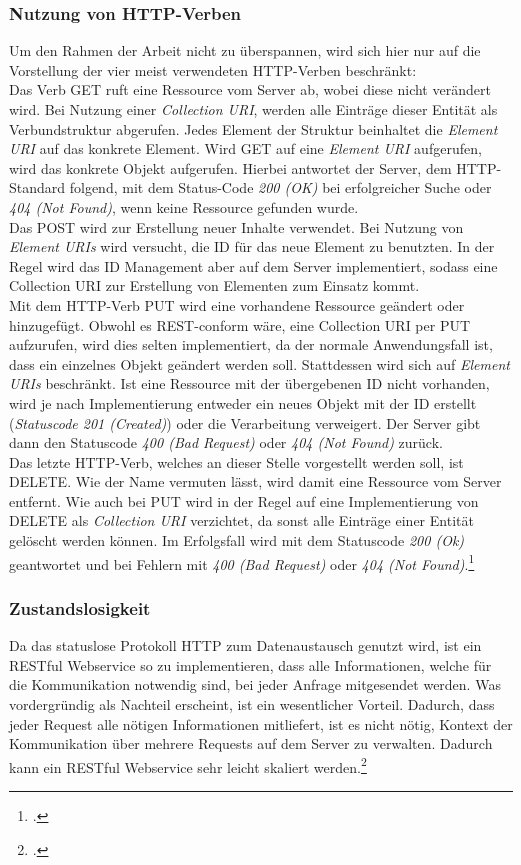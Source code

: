 \subsubsection*{Nutzung von HTTP-Verben}
Um den Rahmen der Arbeit nicht zu überspannen, wird sich hier nur auf die Vorstellung der vier meist verwendeten \ac{HTTP}-Verben beschränkt:\\
Das Verb GET ruft eine Ressource vom Server ab, wobei diese nicht verändert wird. Bei Nutzung einer \textit{Collection \ac{URI}}, werden alle Einträge dieser Entität als Verbundstruktur abgerufen. Jedes Element der Struktur beinhaltet die \textit{Element URI} auf das konkrete Element. Wird GET auf eine \textit{Element URI} aufgerufen, wird das konkrete Objekt aufgerufen. Hierbei antwortet der Server, dem \ac{HTTP}-Standard folgend, mit dem Status-Code \textit{200 (OK)} bei erfolgreicher Suche oder \textit{404 (Not Found)}, wenn keine Ressource gefunden wurde.\\
Das POST wird zur Erstellung neuer Inhalte verwendet. Bei Nutzung von \textit{Element \ac{URI}s} wird versucht, die ID für das neue Element zu benutzten. In der Regel wird das ID Management aber auf dem Server implementiert, sodass eine Collection \ac{URI} zur Erstellung von Elementen zum Einsatz kommt.\\
Mit dem HTTP-Verb PUT wird eine vorhandene Ressource geändert oder hinzugefügt. Obwohl es \ac{REST}-conform wäre, eine Collection \ac{URI} per PUT aufzurufen, wird dies selten implementiert, da der normale Anwendungsfall ist, dass ein einzelnes Objekt geändert werden soll. Stattdessen wird sich auf \textit{Element \ac{URI}s} beschränkt. Ist eine Ressource mit der übergebenen ID nicht vorhanden, wird je nach Implementierung entweder ein neues Objekt mit der ID erstellt (\textit{Statuscode 201 (Created)}) oder die Verarbeitung verweigert. Der Server gibt dann den Statuscode \textit{400 (Bad Request)} oder \textit{404 (Not Found)}  zurück. \\
Das letzte HTTP-Verb, welches an dieser Stelle vorgestellt werden soll, ist DELETE. Wie der Name vermuten lässt, wird damit eine Ressource vom Server entfernt. Wie auch bei PUT wird in der Regel auf eine Implementierung von DELETE als \textit{Collection \ac{URI}} verzichtet, da sonst alle Einträge einer Entität gelöscht werden können. Im Erfolgsfall wird mit dem Statuscode \textit{200 (Ok)} geantwortet und bei Fehlern mit \textit{400 (Bad Request)} oder \textit{404 (Not Found)}.\footcite[S. 26ff.]{REST-und-HTTP}
\subsubsection*{Zustandslosigkeit}
Da das statuslose Protokoll \ac{HTTP} zum Datenaustausch genutzt wird, ist ein \ac{REST}ful Webservice so zu implementieren, dass alle Informationen, welche für die Kommunikation notwendig sind, bei jeder Anfrage mitgesendet werden. Was vordergründig als Nachteil erscheint, ist ein wesentlicher Vorteil. Dadurch, dass jeder Request alle nötigen Informationen mitliefert, ist es nicht nötig, Kontext der Kommunikation über mehrere Requests auf dem Server zu verwalten. Dadurch kann ein \ac{REST}ful Webservice sehr leicht skaliert werden.\footcite[S. 26ff.]{REST-und-HTTP}
